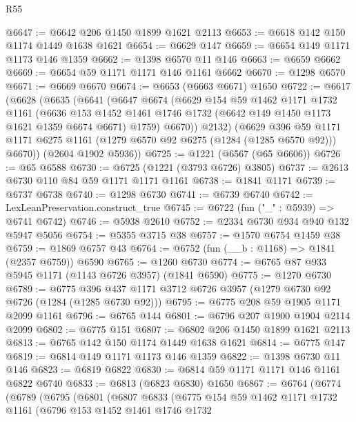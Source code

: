 \begin{lexlean}{R55}
\begin{coremodule}
@6647 := @6642 @206 @1450 @1899 @1621 @2113
@6653 := @6618 @142 @150 @1174 @1449 @1638 @1621
@6654 := @6629 @147
@6659 := @6654 @149 @1171 @1173 @146 @1359
@6662 := @1398 @6570 @11 @146
@6663 := @6659 @6662
@6669 := @6654 @59 @1171 @1171 @146 @1161 @6662
@6670 := @1298 @6570
@6671 := @6669 @6670
@6674 := @6653 (@6663 @6671) @1650
@6722 := @6617
    (@6628
      (@6635
        (@6641
          (@6647
            @6674
            (@6629
              @154
              @59
              @1462
              @1171
              @1732
              @1161
              (@6636
                @153
                @1452
                @1461
                @1746
                @1732
                (@6642 @149 @1450 @1173 @1621 @1359 @6674 @6671)
                @1759)
              @6670))
          @2132)
        (@6629
          @396
          @59
          @1171
          @1171
          @6275
          @1161
          (@1279 @6570 @92 @6275 (@1284 (@1285 @6570 @92)))
          @6670))
      (@2604 @1902 @5936))
@6725 := @1221 (@6567 (@65 @6606))
@6726 := @65 @6588
@6730 := @6725 (@1221 (@3793 @6726) @3805)
@6737 := @2613 @6730 @110 @84 @59 @1171 @1171 @1161
@6738 := @1841 @1171
@6739 := @6737 @6738
@6740 := @1298 @6730
@6741 := @6739 @6740
@6742 := LexLeanPreservation.construct_true
@6745 := @6722 (fun ("_" : @5939) => @6741 @6742)
@6746 := @5938 @2610
@6752 := @2334 @6730 @934 @940 @132 @5947 @5056
@6754 := @5355 @3715 @38
@6757 := @1570 @6754 @1459 @38
@6759 := @1869 @6757 @43
@6764 := @6752 (fun (__b : @1168) => @1841 (@2357 @6759)) @6590
@6765 := @1260 @6730
@6774 := @6765 @87 @933 @5945 @1171 (@1143 @6726 @3957) (@1841 @6590)
@6775 := @1270 @6730
@6789 := @6775 @396 @437 @1171 @3712 @6726 @3957 (@1279 @6730 @92 @6726 (@1284 (@1285 @6730 @92)))
@6795 := @6775 @208 @59 @1905 @1171 @2099 @1161
@6796 := @6765 @144
@6801 := @6796 @207 @1900 @1904 @2114 @2099
@6802 := @6775 @151
@6807 := @6802 @206 @1450 @1899 @1621 @2113
@6813 := @6765 @142 @150 @1174 @1449 @1638 @1621
@6814 := @6775 @147
@6819 := @6814 @149 @1171 @1173 @146 @1359
@6822 := @1398 @6730 @11 @146
@6823 := @6819 @6822
@6830 := @6814 @59 @1171 @1171 @146 @1161 @6822 @6740
@6833 := @6813 (@6823 @6830) @1650
@6867 := @6764
    (@6774
      (@6789
        (@6795
          (@6801
            (@6807
              @6833
              (@6775
                @154
                @59
                @1462
                @1171
                @1732
                @1161
                (@6796
                  @153
                  @1452
                  @1461
                  @1746
                  @1732

\end{coremodule}
\end{lexlean}
